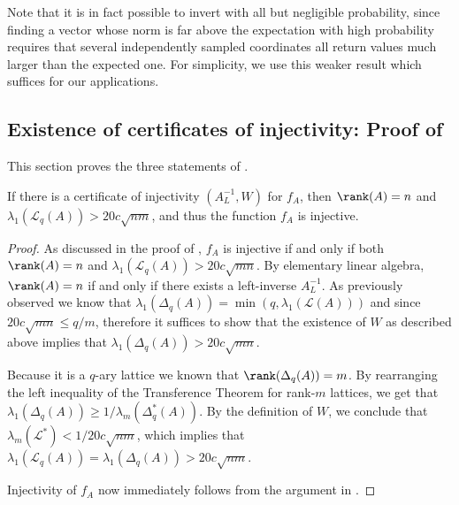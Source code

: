 \documentclass[11pt]{article}
\theoremstyle{definition}
\theoremstyle{plain}
\newenvironment{customprop}[1]
  {\renewcommand\theinnercustomprop{#1}\innercustomprop}
  {\endinnercustomprop}
\theoremstyle{remark}
\newcommand{\LL}{\mathcal{L}}
\begin{document}
Note that it is in fact possible to invert with all but negligible probability, since finding a vector whose norm is far above the expectation with high probability requires that several independently sampled coordinates all return values much larger than the expected one. For simplicity, we use this weaker result which suffices for our applications.

\subsection{Existence of certificates of injectivity: Proof of }
\label{subsec:existence-cert}

This section proves the three statements of . 

\begin{customprop}{\ref{prop:W-equivalence}.i}[Correctness of certificates]
If there is a certificate of injectivity $(A^{-1}_L, W)$ for $f_A$, then $\rank(A)=n$ and $\lambda_1(\LL_q(A)) > 20c\sqrt{nm}$, and thus the function $f_A$ is injective.
\end{customprop}
\begin{proof}
    As discussed in the proof of , $f_A$ is injective if and only if both $\rank(A) = n$ and $\lambda_1(\LL_q(A)) > 20c\sqrt{mn}$. By elementary linear algebra, $\rank(A) = n$ if and only if there exists a left-inverse $A_L^{-1}$.  As previously observed we know that $\lambda_1(\Delta_q(A)) = \min(q,\lambda_1(\LL(A)))$ and since $20c\sqrt{mn} \leq q/m$, therefore it suffices to show that the existence of $W$ as described above implies that $\lambda_1(\Delta_q(A)) > 20c\sqrt{mn}$.

    Because it is a $q$-ary lattice we known that $\rank(\Delta_q(A)) = m$. By rearranging the left inequality of the Transference Theorem for rank-$m$ lattices, we get that $\lambda_1(\Delta_q(A)) \geq {1}/{\lambda_m(\Delta_q^*(A))}$. By the definition of $W$, we conclude that ${\lambda_m(\LL^*)} < 1/20c\sqrt{nm}$, which implies that $\lambda_1(\LL_q(A)) =\lambda_1(\Delta_q(A)) > 20c\sqrt{nm}$.

    Injectivity of $f_A$ now immediately follows from the argument in .
\end{proof}
\end{document}
